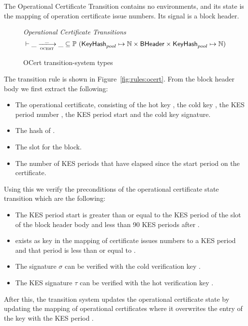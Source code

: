 The Operational Certificate Transition contains no environments, and its state is the mapping of
operation certificate issue numbers.  Its signal is a block header.

\begin{figure}
  \emph{Operational Certificate Transitions}
  \begin{equation*}
    \vdash \var{\_} \trans{ocert}{\_} \var{\_} \subseteq
    \powerset (\KeyHash_{pool} \mapsto \N \times \BHeader \times \KeyHash_{pool} \mapsto \N)
  \end{equation*}
  \caption{OCert transition-system types}
  \label{fig:ts-types:ocert}
\end{figure}

The transition rule is shown in Figure~\ref{fig:rules:ocert}. From the block
header body  we first extract the following:

\begin{itemize}
  \item The operational certificate, consisting of the hot key , the cold key
    , the KES period number , the KES period start  and the cold key
  signature.
\item The hash  of .
\item The slot  for the block.
\item The number of KES periods that have elapsed since the start period on the certificate.
\end{itemize}

Using this we verify the preconditions of the operational certificate state
transition which are the following:

\begin{itemize}
\item The KES period start  is greater than or equal to the KES period of
  the slot of the block header body and less than 90 KES periods after .
\item {} exists as key in the mapping of certificate issues numbers to a KES
  period  and that period is less than or equal to .
\item The signature $\sigma$ can be verified with the cold verification key
  .
\item The KES signature $\tau$ can be verified with the hot verification key
  .
\end{itemize}

After this, the transition system updates the operational certificate state by
updating the mapping of operational certificates where it overwrites the entry
of the key  with the KES period .

